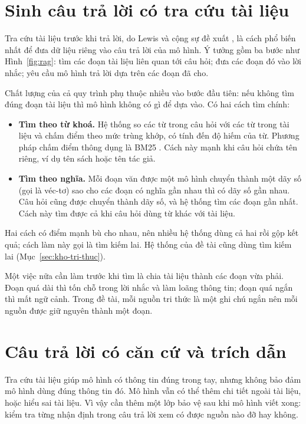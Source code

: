 \section{Sinh câu trả lời có tra cứu tài liệu}

Tra cứu tài liệu trước khi trả lời, do Lewis và cộng sự đề xuất , là cách phổ biến nhất để đưa dữ liệu riêng vào câu trả lời của mô hình. Ý tưởng gồm ba bước như Hình~\ref{fig:rag}: tìm các đoạn tài liệu liên quan tới câu hỏi; đưa các đoạn đó vào lời nhắc; yêu cầu mô hình trả lời dựa trên các đoạn đã cho.


Chất lượng của cả quy trình phụ thuộc nhiều vào bước đầu tiên: nếu không tìm đúng đoạn tài liệu thì mô hình không có gì để dựa vào. Có hai cách tìm chính:

\begin{itemize}
    \item \textbf{Tìm theo từ khoá.} Hệ thống so các từ trong câu hỏi với các từ trong tài liệu và chấm điểm theo mức trùng khớp, có tính đến độ hiếm của từ. Phương pháp chấm điểm thông dụng là BM25 . Cách này mạnh khi câu hỏi chứa tên riêng, ví dụ tên sách hoặc tên tác giả.
    \item \textbf{Tìm theo nghĩa.} Mỗi đoạn văn được một mô hình chuyển thành một dãy số (gọi là véc-tơ) sao cho các đoạn có nghĩa gần nhau thì có dãy số gần nhau. Câu hỏi cũng được chuyển thành dãy số, và hệ thống tìm các đoạn gần nhất. Cách này tìm được cả khi câu hỏi dùng từ khác với tài liệu.
\end{itemize}

Hai cách có điểm mạnh bù cho nhau, nên nhiều hệ thống dùng cả hai rồi gộp kết quả; cách làm này gọi là tìm kiếm lai. Hệ thống của đề tài cũng dùng tìm kiếm lai (Mục~\ref{sec:kho-tri-thuc}).

Một việc nữa cần làm trước khi tìm là chia tài liệu thành các đoạn vừa phải. Đoạn quá dài thì tốn chỗ trong lời nhắc và làm loãng thông tin; đoạn quá ngắn thì mất ngữ cảnh. Trong đề tài, mỗi nguồn tri thức là một ghi chú ngắn nên mỗi nguồn được giữ nguyên thành một đoạn.

\section{Câu trả lời có căn cứ và trích dẫn}

Tra cứu tài liệu giúp mô hình có thông tin đúng trong tay, nhưng không bảo đảm mô hình dùng đúng thông tin đó. Mô hình vẫn có thể thêm chi tiết ngoài tài liệu, hoặc hiểu sai tài liệu. Vì vậy cần thêm một lớp bảo vệ sau khi mô hình viết xong: kiểm tra từng nhận định trong câu trả lời xem có được nguồn nào đỡ hay không.

